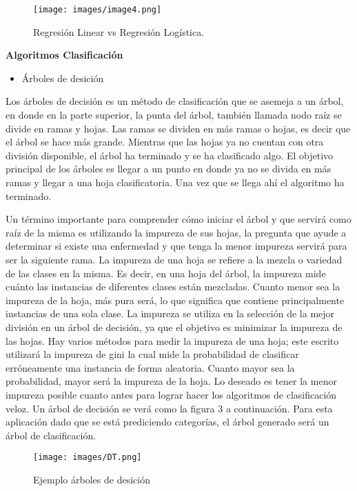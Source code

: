 \documentclass[twocolumn]{bmcart}%
\begin{document}
\begin{figure}[h!]
  \caption{\csentence{}
      Regresión Linear vs Regresión Logística.}
\texttt{[image: images/image4.png]}  
      \end{figure}


\textbf{Algoritmos Clasificación}
\begin{itemize}
    \item Árboles de desición
\end{itemize}

Los árboles de decisión es un método de clasificación que se asemeja a un árbol, en donde en la parte superior, la punta del árbol, también llamada nodo raíz se divide en ramas y hojas. Las ramas se dividen en más ramas o hojas, es decir que el árbol se hace más grande. Mientras que las hojas ya no cuentan con otra división disponible, el árbol ha terminado y se ha clasificado algo. El objetivo principal de los árboles es llegar a un punto en donde ya no se divida en más ramas y llegar a una hoja clasificatoria. Una vez que se llega ahí el algoritmo ha terminado. 

Un término importante para comprender cómo iniciar el árbol y que servirá como raíz de la misma es utilizando la impureza de sus hojas, la pregunta que ayude a determinar si existe una enfermedad y que tenga la menor impureza servirá para ser la siguiente rama. La impureza de una hoja  se refiere a la mezcla o variedad de las clases en la misma. Es decir, en una hoja del árbol, la impureza mide cuánto las instancias de diferentes clases están mezcladas. Cuanto menor sea la impureza de la hoja, más pura será, lo que significa que contiene principalmente instancias de una sola clase. La impureza se utiliza en la selección de la mejor división en un árbol de decisión, ya que el objetivo es minimizar la impureza de las hojas. Hay varios métodos para medir la impureza de una hoja; este escrito utilizará la impureza de gini la cual  mide la probabilidad de clasificar erróneamente una instancia de forma aleatoria. Cuanto mayor sea la probabilidad, mayor será la impureza de la hoja. Lo deseado es tener la menor impureza posible cuanto antes para lograr hacer los algoritmos de clasificación veloz.  Un árbol de decisión se verá como la figura 3 a continuación. 
Para esta aplicación dado que se está prediciendo categorías, el árbol generado será un árbol de clasificación. \cite{SQ4}



\begin{figure}[h!]
  \caption{\csentence{}
      Ejemplo árboles de desición}
\texttt{[image: images/DT.png]}  
      \end{figure}
\end{document}

